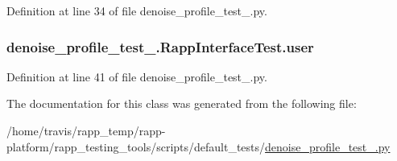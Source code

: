 Definition at line 34 of file denoise\-\_\-profile\-\_\-test\-\_.\-py.

\hypertarget{classdenoise__profile__test__1_1_1RappInterfaceTest_affade8228735bf48bf678a94efd78f90}{
\subsubsection[{user}]{\setlength{\rightskip}{0pt plus 5cm}denoise\-\_\-profile\-\_\-test\-\_.\-Rapp\-Interface\-Test.\-user}}\label{classdenoise__profile__test__1_1_1RappInterfaceTest_affade8228735bf48bf678a94efd78f90}


Definition at line 41 of file denoise\-\_\-profile\-\_\-test\-\_.\-py.



The documentation for this class was generated from the following file\-:\begin{DoxyCompactItemize}
\item 
/home/travis/rapp\-\_\-temp/rapp-\/platform/rapp\-\_\-testing\-\_\-tools/scripts/default\-\_\-tests/\hyperlink{denoise__profile__test__1_8py}{denoise\-\_\-profile\-\_\-test\-\_.\-py}\end{DoxyCompactItemize}
